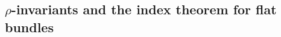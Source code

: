 \documentclass[12pt]{article}
\newcommand{\Z}{{\mathbb{Z}}}
\newcommand{\Q}{{\mathbb{Q}}}
\newcommand{\Hom}{{\tt Hom}}
\renewcommand{\lim}{{\tt lim}}
\newcommand{\colim}{{\tt colim}}
\begin{document}


% 


%
% 

\subsection{$\rho$-invariants and the index theorem for flat bundles}\label{sec501}
\end{document}
